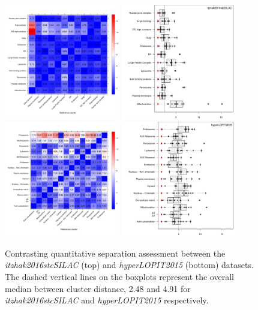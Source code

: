 \documentclass[12pt]{article}\usepackage[]{graphicx}\usepackage[]{color}
\begin{document}
\begin{figure}[h]
  \centering
  \includegraphics[width = 0.45\textwidth]{./figure/qsep0lv-3.pdf}
  \includegraphics[width = 0.45\textwidth]{./figure/qsepcmp-2.pdf}
  \includegraphics[width = 0.45\textwidth]{./figure/qsep0lv-2.pdf}
  \includegraphics[width = 0.45\textwidth]{./figure/qsepcmp-1.pdf}
  \caption{Contrasting quantitative separation assessment between the
    \textit{itzhak2016stcSILAC} \citep{Itzhak:2016} (top) and
    \textit{hyperLOPIT2015} \citep{Christoforou:2016} (bottom)
    datasets. The dashed vertical lines on the boxplots represent the
    overall median between cluster distance, 2.48 and
    4.91 for \textit{itzhak2016stcSILAC} and
    \textit{hyperLOPIT2015} respectively. }
  \label{fig:qsepcmp}
\end{figure}
\end{document}
